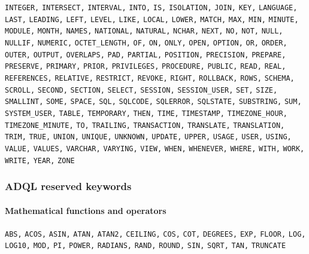 \documentclass[11pt,a4paper]{ivoa}
\begin{document}
\begin{raggedright}
\texttt{INTEGER,} \texttt{INTERSECT,} \texttt{INTERVAL,}
\texttt{INTO,} \texttt{IS,} \texttt{ISOLATION,} \texttt{JOIN,}
\texttt{KEY,} \texttt{LANGUAGE,} \texttt{LAST,} \texttt{LEADING,}
\texttt{LEFT,} \texttt{LEVEL,} \texttt{LIKE,} \texttt{LOCAL,} \texttt{LOWER,}
\texttt{MATCH,} \texttt{MAX,} \texttt{MIN,}
\texttt{MINUTE,} \texttt{MODULE,} \texttt{MONTH,} \texttt{NAMES,}
\texttt{NATIONAL,} \texttt{NATURAL,} \texttt{NCHAR,} \texttt{NEXT,}
\texttt{NO,} \texttt{NOT,} \texttt{NULL,} \texttt{NULLIF,}
\texttt{NUMERIC,} \texttt{OCTET\_LENGTH,} \texttt{OF,} \texttt{ON,}
\texttt{ONLY,} \texttt{OPEN,} \texttt{OPTION,} \texttt{OR,}
\texttt{ORDER,} \texttt{OUTER,} \texttt{OUTPUT,} \texttt{OVERLAPS,}
\texttt{PAD,} \texttt{PARTIAL,} \texttt{POSITION,}
\texttt{PRECISION,} \texttt{PREPARE,} \texttt{PRESERVE,}
\texttt{PRIMARY,} \texttt{PRIOR,} \texttt{PRIVILEGES,}
\texttt{PROCEDURE,} \texttt{PUBLIC,} \texttt{READ,} \texttt{REAL,}
\texttt{REFERENCES,} \texttt{RELATIVE,} \texttt{RESTRICT,}
\texttt{REVOKE,} \texttt{RIGHT,} \texttt{ROLLBACK,} \texttt{ROWS,}
\texttt{SCHEMA,} \texttt{SCROLL,} \texttt{SECOND,} \texttt{SECTION,}
\texttt{SELECT,} \texttt{SESSION,} \texttt{SESSION\_USER,}
\texttt{SET,} \texttt{SIZE,} \texttt{SMALLINT,} \texttt{SOME,}
\texttt{SPACE,} \texttt{SQL,} \texttt{SQLCODE,} \texttt{SQLERROR,}
\texttt{SQLSTATE,} \texttt{SUBSTRING,} \texttt{SUM,}
\texttt{SYSTEM\_USER,} \texttt{TABLE,} \texttt{TEMPORARY,}
\texttt{THEN,} \texttt{TIME,} \texttt{TIMESTAMP,}
\texttt{TIMEZONE\_HOUR,} \texttt{TIMEZONE\_MINUTE,} \texttt{TO,}
\texttt{TRAILING,} \texttt{TRANSACTION,} \texttt{TRANSLATE,}
\texttt{TRANSLATION,} \texttt{TRIM,} \texttt{TRUE,} \texttt{UNION,}
\texttt{UNIQUE,} \texttt{UNKNOWN,} \texttt{UPDATE,} \texttt{UPPER,}
\texttt{USAGE,} \texttt{USER,} \texttt{USING,} \texttt{VALUE,}
\texttt{VALUES,} \texttt{VARCHAR,} \texttt{VARYING,} \texttt{VIEW,}
\texttt{WHEN,} \texttt{WHENEVER,} \texttt{WHERE,} \texttt{WITH,}
\texttt{WORK,} \texttt{WRITE,} \texttt{YEAR,} \texttt{ZONE}
\end{raggedright}

\subsubsection{ADQL reserved keywords}
\label{sec:adql.reswords}


\begin{raggedright}
\paragraph{Mathematical functions and operators}
\texttt{ABS,} \texttt{ACOS,} \texttt{ASIN,} \texttt{ATAN,}
\texttt{ATAN2,} \texttt{CEILING,} \texttt{COS,} \texttt{COT,}
\texttt{DEGREES,} \texttt{EXP,} \texttt{FLOOR,} \texttt{LOG,}
\texttt{LOG10,} \texttt{MOD,}  \texttt{PI,} \texttt{POWER,}
\texttt{RADIANS,} \texttt{RAND,} \texttt{ROUND,} \texttt{SIN,}
\texttt{SQRT,} \texttt{TAN,} \texttt{TRUNCATE}
\end{raggedright}
\end{document}
